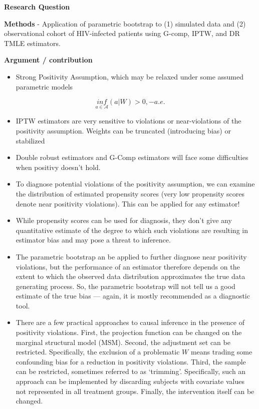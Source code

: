 \documentclass[
]{book}
\providecommand{\tightlist}{%
  \setlength{\itemsep}{0pt}\setlength{\parskip}{0pt}}
\begin{document}
\textbf{Research Question}

\textbf{Methods}
- Application of parametric bootstrap to (1) simulated data and (2) observational cohort of HIV-infected patients using G-comp, IPTW, and DR TMLE estimators.

\textbf{Argument / contribution}

\begin{itemize}
\tightlist
\item
  Strong Positivity Assumption, which may be relaxed under some assumed parametric models
\end{itemize}

\begin{equation}
\underset{a \in \mathcal{A}}{inf}(a | W) > 0, -a.e.
\end{equation}

\begin{itemize}
\tightlist
\item
  IPTW estimators are very sensitive to violations or near-violations of the positivity assumption. Weights can be truncated (introducing bias) or stabilized
\item
  Double robust estimators and G-Comp estimators will face some difficulties when positivy doesn't hold.
\item
  To diagnose potential violations of the positivity assumption, we can examine the distribution of estimated propensity scores (very low propensity scores denote near positivity violations). This can be applied for any estimator!
\item
  While propensity scores can be used for diagnosis, they don't give any quantitative estimate of the degree to which such violations are resulting in estimator bias and may pose a threat to inference.
\item
  The parametric bootstrap an be applied to further diagnose near positivity violations, but the performance of an estimator therefore depends on the extent to which the observed data distribution approximates the true data generating process. So, the parametric bootstrap will not tell us a good estimate of the true bias --- again, it is mostly recommended as a diagnostic tool.
\item
  There are a few practical approaches to causal inference in the presence of positivity violations. First, the projection function can be changed on the marginal structural model (MSM). Second, the adjustment set can be restricted. Specifically, the exclusion of a problematic \(W\) means trading some confounding bias for a reduction in positivity violations. Third, the sample can be restricted, sometimes referred to as `trimming'. Specifically, such an approach can be implemented by discarding subjects with covariate values not represented in all treatment groups. Finally, the intervention itself can be changed.
\end{itemize}
\end{document}
